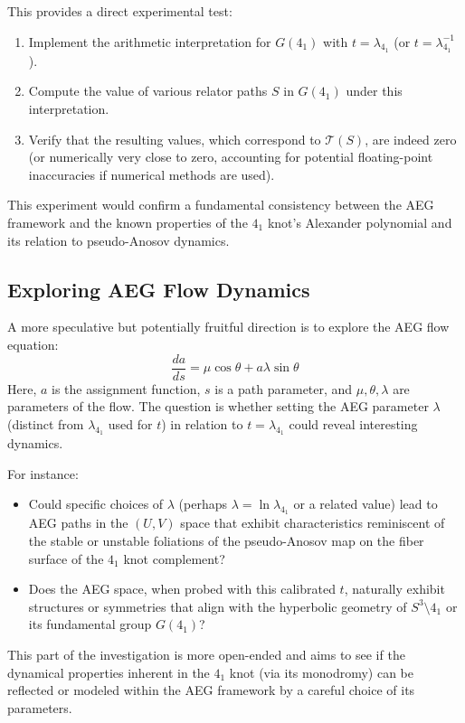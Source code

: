 \documentclass{article}
\begin{document}
This provides a direct experimental test:
\begin{enumerate}
    \item Implement the arithmetic interpretation for $G(4_1)$ with $t = \lambda_{4_1}$ (or $t = \lambda_{4_1}^{-1}$).
    \item Compute the value of various relator paths $S$ in $G(4_1)$ under this interpretation.
    \item Verify that the resulting values, which correspond to $\mathcal{T}(S)$, are indeed zero (or numerically very close to zero, accounting for potential floating-point inaccuracies if numerical methods are used).
\end{enumerate}
This experiment would confirm a fundamental consistency between the AEG framework and the known properties of the $4_1$ knot's Alexander polynomial and its relation to pseudo-Anosov dynamics.

\subsection{Exploring AEG Flow Dynamics}
A more speculative but potentially fruitful direction is to explore the AEG flow equation:
\[
\frac{da}{ds} = \mu \cos \theta + a\lambda \sin \theta
\]
Here, $a$ is the assignment function, $s$ is a path parameter, and $\mu, \theta, \lambda$ are parameters of the flow. The question is whether setting the AEG parameter $\lambda$ (distinct from $\lambda_{4_1}$ used for $t$) in relation to $t = \lambda_{4_1}$ could reveal interesting dynamics.

For instance:
\begin{itemize}
    \item Could specific choices of $\lambda$ (perhaps $\lambda = \ln \lambda_{4_1}$ or a related value) lead to AEG paths in the $(U,V)$ space that exhibit characteristics reminiscent of the stable or unstable foliations of the pseudo-Anosov map on the fiber surface of the $4_1$ knot complement?
    \item Does the AEG space, when probed with this calibrated $t$, naturally exhibit structures or symmetries that align with the hyperbolic geometry of $S^3 \setminus 4_1$ or its fundamental group $G(4_1)$?
\end{itemize}
This part of the investigation is more open-ended and aims to see if the dynamical properties inherent in the $4_1$ knot (via its monodromy) can be reflected or modeled within the AEG framework by a careful choice of its parameters.
\end{document}
